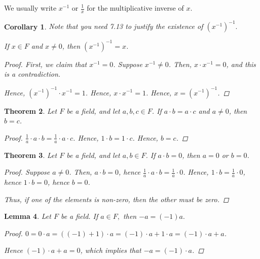 \documentclass[11pt]{article}
\newtheorem{theorem}{Theorem}[section]
\newtheorem{lemma}[theorem]{Lemma}
\newtheorem{corollary}[theorem]{Corollary}
\theoremstyle{definition}
\numberwithin{equation}{subsection}
\newcommand{\com}[1]{{\color{blue} #1}} %
\begin{document}
We usually write $x^{-1}$ or $\frac{1}{x}$ for the multiplicative inverse of $x$.

\begin{corollary}\com{ Note that you need 7.13 to justify the existence of $(x^{-1})^{-1}.$}

	If $x\in F$ and $x\neq 0$, then $(x^{-1})^{-1}=x$.
    
\begin{proof}
First, we claim that $x^{-1}=0$. Suppose $x^{-1}\neq 0$. Then, $x \cdot x^{-1} = 0$, and this is a contradiction. 

Hence, $(x^{-1})^{-1}\cdot x^{-1}=1$. Hence, $x \cdot x^{-1}=1$. Hence, $x=(x^{-1})^{-1}$.

\renewcommand\qedsymbol{QED}
\end{proof}


\end{corollary}


\begin{theorem}
	Let $F$ be a field, and let $a, b, c \in F$. If $a \cdot b = a \cdot c$ and $a \neq 0$, then $b = c$.
    
\begin{proof}
$\frac{1}{a}\cdot a \cdot b= \frac{1}{a}\cdot a \cdot c$. Hence, $1 \cdot b=1 \cdot c$. Hence, $b=c$.



\renewcommand\qedsymbol{QED}
\end{proof}


\end{theorem}


\begin{theorem}
	Let $F$ be a field, and let $a, b\in F$.  If $a \cdot b = 0$, then $a = 0$ or $b = 0$.
    
\begin{proof}
Suppose $a \neq 0$. Then, $a\cdot b=0$, hence $\frac{1}{a}\cdot a\cdot b=\frac{1}{a}\cdot 0$. Hence, $1\cdot b=\frac{1}{a}\cdot 0$, hence $1 \cdot b=0$, hence $b=0$.

Thus, if one of the elements is non-zero, then the other must be zero.


\renewcommand\qedsymbol{QED}
\end{proof}


\end{theorem}

\begin{lemma}
	Let $F$ be a field. If $a\in F,$ then $-a=(-1)a.$
    
\begin{proof}
$0=0\cdot a=((-1)+1)\cdot a=(-1)\cdot a + 1 \cdot a=(-1)\cdot a + a$.

Hence $(-1)\cdot a + a = 0$, which implies that $-a=(-1)\cdot a$.

\renewcommand\qedsymbol{QED}
\end{proof}


\end{lemma}
\end{document}
